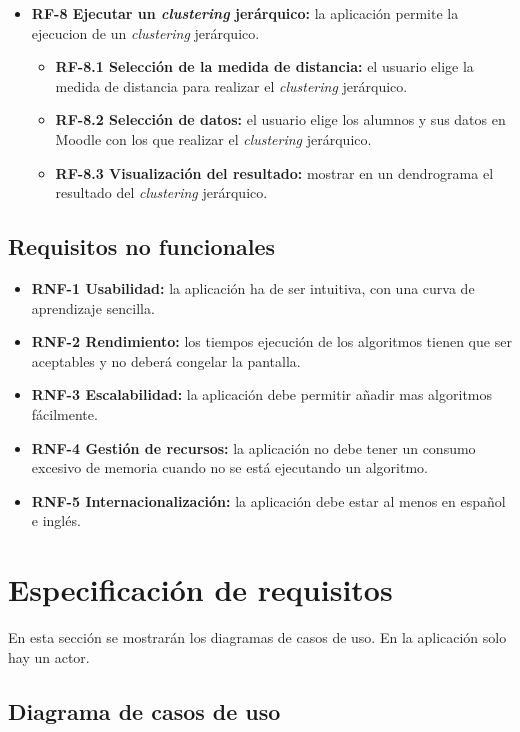 \begin{itemize}
	\item \textbf{RF-8 Ejecutar un \emph{clustering} jerárquico:} la aplicación permite la ejecucion de un \emph{clustering} jerárquico.
	\begin{itemize}
		\item \textbf{RF-8.1 Selección de la medida de distancia:} el usuario elige la medida de distancia para realizar el \emph{clustering} jerárquico.
		\item \textbf{RF-8.2 Selección de datos:} el usuario elige los alumnos y sus datos en Moodle con los que realizar el \emph{clustering} jerárquico.
		\item \textbf{RF-8.3 Visualización del resultado:} mostrar en un dendrograma el resultado del \emph{clustering} jerárquico.
	\end{itemize}
\end{itemize}

\subsection{Requisitos no funcionales}
\begin{itemize}
	\item \textbf{RNF-1 Usabilidad:} la aplicación ha de ser intuitiva, con una curva de aprendizaje sencilla.
	\item \textbf{RNF-2 Rendimiento:} los tiempos ejecución de los algoritmos tienen que ser aceptables y no deberá congelar la pantalla.
	\item \textbf{RNF-3 Escalabilidad:} la aplicación debe permitir añadir mas algoritmos fácilmente.
	\item \textbf{RNF-4 Gestión de recursos:} la aplicación no debe tener un consumo excesivo de memoria cuando no se está ejecutando un algoritmo.
	\item \textbf{RNF-5 Internacionalización:} la aplicación debe estar al menos en español e inglés.
\end{itemize}

\section{Especificación de requisitos}
En esta sección se mostrarán los diagramas de casos de uso. En la aplicación solo hay un actor.

\subsection{Diagrama de casos de uso}

